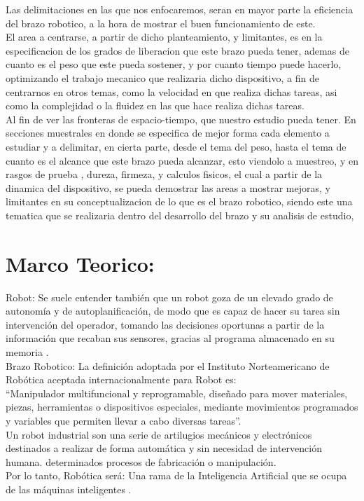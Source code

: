 \documentclass[14pt,a4paper]{article}
\begin{document}
Las delimitaciones en las que nos enfocaremos, seran en mayor parte la eficiencia del brazo robotico, a la hora de mostrar el buen funcionamiento de este.\\
El area a centrarse, a partir de dicho planteamiento, y limitantes, es en la especificacion de los grados de liberacion que este brazo pueda tener, ademas de cuanto es el peso que este pueda sostener, y por cuanto tiempo puede hacerlo, optimizando el trabajo mecanico que realizaria dicho dispositivo, a fin de centrarnos en otros temas, como la velocidad en que realiza dichas tareas, asi como la complejidad o la fluidez en las que hace realiza dichas tareas.\\
Al fin de ver las fronteras de espacio-tiempo, que nuestro estudio pueda tener. En secciones muestrales en donde se especifica de mejor forma cada elemento a estudiar y a delimitar, en cierta parte, desde el tema del peso, hasta el tema de cuanto es el alcance que este brazo pueda alcanzar, esto viendolo a muestreo, y en rasgos de prueba , dureza, firmeza, y calculos fisicos, el cual a partir de la dinamica del dispositivo, se pueda demostrar las areas a mostrar mejoras, y limitantes en su conceptualizacion de lo que es el brazo robotico, siendo este una tematica que se realizaria dentro del desarrollo del brazo y su analisis de estudio,

\section{Marco Teorico:}

Robot:
Se suele entender también que un robot goza de un elevado grado de autonomía y de autoplanificación, de modo que es capaz de hacer su tarea sin intervención del operador, tomando las decisiones oportunas a partir de la información que recaban sus sensores, gracias al programa almacenado en su memoria \citep{turiel2002aplicaciones} .\\ 

Brazo Robotico:
La definición adoptada por el Instituto Norteamericano de Robótica aceptada internacionalmente para Robot es:\\

“Manipulador multifuncional y reprogramable, diseñado para mover materiales, piezas, herramientas o dispositivos especiales, mediante movimientos programados y variables que permiten llevar a cabo diversas tareas”.\\
Un robot industrial son una serie de artilugios mecánicos y electrónicos destinados a realizar de forma automática y sin necesidad de intervención humana. determinados procesos de fabricación o manipulación.\\
Por lo tanto, Robótica será:  Una rama de la Inteligencia Artificial que se ocupa de las máquinas inteligentes \citep{cardenas2015diseno}.
\newpage
\end{document}
